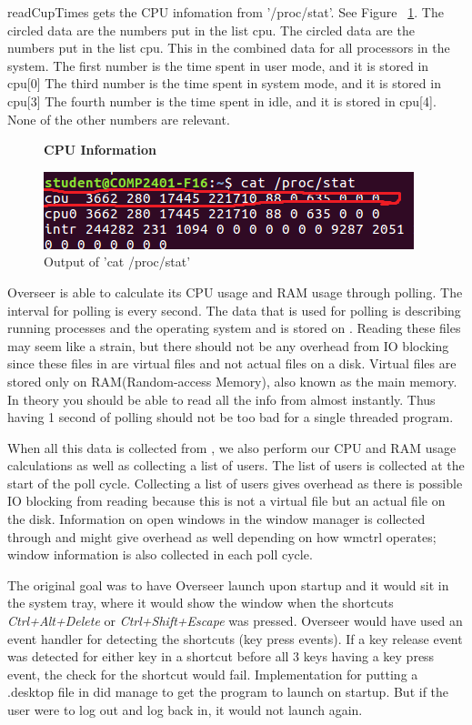\documentclass[12pt]{article}
\begin{document}
readCupTimes gets the CPU infomation from '/proc/stat'.
See Figure ~\ref{figCPUInfo}.
The circled data are the numbers put in the list cpu.
The circled data are the numbers put in the list cpu.
This in the combined data for all processors in the system.
The first number is the time spent in user mode, and it is stored in cpu[0]
The third number is the time spent in system mode, and it is stored in cpu[3]
The fourth number is the time spent in idle, and it is stored in cpu[4].
None of the other numbers are relevant.
\begin{figure}[h]
	\centering
	\textbf{CPU Information}\par\medskip
	\includegraphics{totalCPU}
	\caption{Output of 'cat /proc/stat'}
	\label{figCPUInfo}
\end{figure}

Overseer is able to calculate its CPU usage and RAM usage through polling.
The interval for polling is every second.
The data that is used for polling is describing running processes and the operating system and is stored on .
Reading these files may seem like a strain, but there should not be any overhead from IO blocking since these files in  are virtual files and not actual files on a disk.
Virtual files are stored only on RAM(Random-access Memory), also known as the main memory.
In theory you should be able to read all the info from  almost instantly.
Thus having 1 second of polling should not be too bad for a single threaded program.

When all this data is collected from , we also perform our CPU and RAM usage calculations as well as collecting a list of users.
The list of users is collected at the start of the poll cycle.
Collecting a list of users gives overhead as there is possible IO blocking from reading  because this is not a virtual file but an actual file on the disk.
Information on open windows in the window manager is collected through  and might give overhead as well depending on how wmctrl operates; window information is also collected in each poll cycle.

The original goal was to have Overseer launch upon startup and it would sit in the system tray, where it would show the window when the shortcuts \emph{Ctrl+Alt+Delete} or \emph{Ctrl+Shift+Escape} was pressed.
Overseer would have used an event handler for detecting the shortcuts (key press events).
If a key release event was detected for either key in a shortcut before all 3 keys having a key press event, the check for the shortcut would fail.
Implementation for putting a .desktop file in  did manage to get the program to launch on startup. But if the user were to log out and log back in, it would not launch again.
\end{document}
